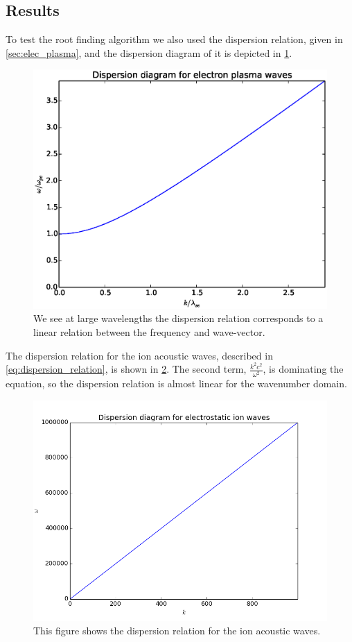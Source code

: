 \documentclass[x11names]{article}
\begin{document}
\subsection{Results}
  To test the root finding algorithm we also used the dispersion relation, given in \cref{sec:elec_plasma}, and the dispersion diagram of it is depicted in \cref{fig:simple_diagram}. 

  \begin{figure}
  \centering
    \includegraphics[width = 0.60 \textwidth]{figures/simple_dispersion}
    \caption{We see at large wavelengths the dispersion relation corresponds to a linear relation between the frequency and wave-vector.}
    \label{fig:simple_diagram}
  \end{figure}


  The dispersion relation for the ion acoustic waves, described in \cref{eq:dispersion_relation}, is shown in \cref{fig:ionAcousticDispers}. The second term, \(\frac{k^2c^2}{\omega^2}\), is dominating the equation, so the dispersion relation is almost linear for the wavenumber domain.
  \begin{figure}
  \centering
    \includegraphics[width = 0.60 \textwidth]{figures/ionAcousticWaves}
    \caption{This figure shows the dispersion relation for the ion acoustic waves.}
    \label{fig:ionAcousticDispers}
  \end{figure}
\end{document}
